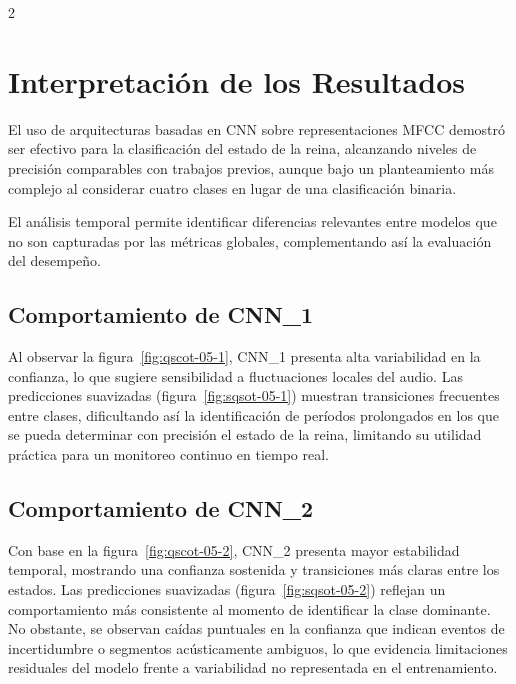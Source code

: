 \documentclass[12pt]{report}
\newenvironment{tightmulticols}{%
  \begin{multicols}{2}
  \setlength{\parskip}{1.2pt}
  \linespread{1}\selectfont
}{%
  \end{multicols}
}
\begin{document}
\begin{tightmulticols}

\section{Interpretación de los Resultados}

\noindent El uso de arquitecturas basadas en CNN sobre representaciones MFCC demostró ser efectivo para la clasificación del estado de la reina, alcanzando niveles de precisión comparables con trabajos previos, aunque bajo un planteamiento más complejo al considerar cuatro clases en lugar de una clasificación binaria.

\par El análisis temporal permite identificar diferencias relevantes entre modelos que no son capturadas por las métricas globales, complementando así la evaluación del desempeño.

\subsection{Comportamiento de CNN\_1}

\noindent Al observar la figura~\ref{fig:qscot-05-1}, CNN\_1 presenta alta variabilidad en la confianza, lo que sugiere sensibilidad a fluctuaciones locales del audio. Las predicciones suavizadas (figura~\ref{fig:sqsot-05-1}) muestran transiciones frecuentes entre clases, dificultando así la identificación de períodos prolongados en
los que se pueda determinar con precisión el estado de la reina, limitando su utilidad práctica para un monitoreo continuo en tiempo real.

\subsection{Comportamiento de CNN\_2}

\noindent Con base en la figura~\ref{fig:qscot-05-2}, CNN\_2 presenta mayor estabilidad temporal, mostrando una confianza sostenida y transiciones más claras entre los estados. Las predicciones suavizadas (figura~\ref{fig:sqsot-05-2}) reflejan un comportamiento más consistente al momento de identificar la clase dominante. No obstante, se observan caídas puntuales en la confianza que indican eventos de incertidumbre o segmentos acústicamente ambiguos, lo que evidencia limitaciones residuales del modelo frente a variabilidad no representada en el entrenamiento.


\end{tightmulticols}
\end{document}
